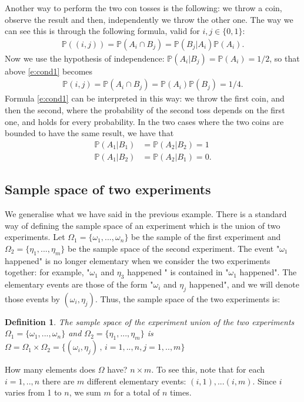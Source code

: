 \documentclass[12pt]{article}
\newtheorem{definition}[theorem]{Definition}
\newcommand{\<}{{\langle \!\! \langle}}
\renewcommand{\>}{{\rangle \!\! \rangle}}
\newcommand{\bel}[2]{\begin{equation} \label{#1} \begin{split} #2
 					\end{split} \end{equation}}
\begin{document}
Another way to perform the two con tosses is the following: we throw a coin, observe the result and then, independently we throw the other one. The way we can see this is through the following formula, valid for $i,j\in\{0,1\}$: 
\bel{e:cond1}{\mathbb{P}((i,j))=\mathbb{P}(A_i\cap B_j)=\mathbb{P}(B_j|A_i)\mathbb{P}(A_i).}
Now we use the hypothesis of independence: $\mathbb{P}(A_i | B_j) = \mathbb{P}(A_i) =1/2 $, so that above \eqref{e:cond1} becomes 
\bel{}{\mathbb{P}(i,j) = \mathbb{P}(A_i \cap B_j) = \mathbb{P}(A_i)\mathbb{P}(B_j) = 1/4.}
Formula \eqref{e:cond1} can be interpreted in this way: we throw the first coin, and then the second, where the probability of the second toss depends on the first one, and holds for every probability. In the two cases where the two coins are bounded to have the same result, we have that\bel{}{\mathbb{P}(A_1|B_1) &  =\mathbb{P}(A_2|B_2) = 1\\ \mathbb{P}(A_1|B_2) &= \mathbb{P}(A_2| B_1) = 0.} 

\subsection{Sample space of two experiments}

We generalise what we have said in the previous example. There is a standard way of defining the sample space of an experiment which is the union of two experiments. Let $\Omega_1=\{\omega_1,...,\omega_n\}$ be the sample of the first experiment and $\Omega_2 =\{\eta_1,...,\eta_m\}$ be the sample space of the second experiment. The  event "$\omega_1$ happened" is no longer elementary when we consider the two experiments together: for example, "$\omega_1$ and $\eta_3$ happened " is contained in "$\omega_1 $ happened". The elementary events are those of the form "$\omega_i$ and $\eta_j$ happened", and we will denote those events by $(\omega_i,\eta_j)$. Thus, the sample space of the two experiments is: 
\begin{definition}
The sample space of the experiment union of the two experiments $\Omega_1=\{\omega_1,...,\omega_n\}$ and $\Omega_2=\{\eta_1,...,\eta_m\}$ is $\Omega=\Omega_1\times \Omega_2=\{(\omega_i,\eta_j)\,,\,i=1,..,n, j=1,..,m\}$
\end{definition}
\begin{ExerciseList}

\Exercise How many elements does $\Omega$ have?
\Answer $n\times m $. To see this, note that for each $i=1,..,n$ there are $m$ different elementary events: $(i,1),...(i,m)$. Since $i$ varies from 1 to $n$, we sum $m$ for a total of $n$ times.

\end{ExerciseList}
\end{document}
